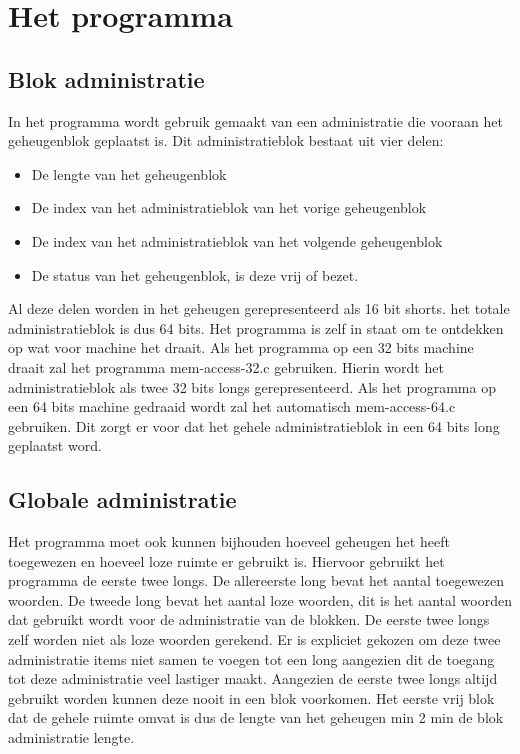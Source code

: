 \documentclass[11pt]{article}
\begin{document}
	\section{Het programma}\label{sec:programma}	
		\subsection{Blok administratie}\label{sec:programmablok}
			In het programma wordt gebruik gemaakt van een administratie die vooraan het geheugenblok geplaatst is. Dit administratieblok bestaat uit vier delen:
			\begin{itemize}
				\item De lengte van het geheugenblok
				\item De index van het administratieblok van het vorige geheugenblok
				\item De index van het administratieblok van het volgende geheugenblok
				\item De status van het geheugenblok, is deze vrij of bezet.
			\end{itemize}
			Al deze delen worden in het geheugen gerepresenteerd als 16 bit shorts. het totale administratieblok is dus 64 bits.
			Het programma is zelf in staat om te ontdekken op wat voor machine het draait.
			Als het programma op een 32 bits machine draait zal het programma mem-access-32.c gebruiken.
			Hierin wordt het administratieblok als twee 32 bits longs gerepresenteerd.
			Als het programma op een 64 bits machine gedraaid wordt zal het automatisch mem-access-64.c gebruiken.
			Dit zorgt er voor dat het gehele administratieblok in een 64 bits long geplaatst word.
		
		\subsection{Globale administratie}\label{sec:programmaglobaal}
			Het programma moet ook kunnen bijhouden hoeveel geheugen het heeft toegewezen en hoeveel loze ruimte er gebruikt is.
			Hiervoor gebruikt het programma de eerste twee longs. De allereerste long bevat het aantal toegewezen woorden.
			De tweede long bevat het aantal loze woorden, dit is het aantal woorden dat gebruikt wordt voor de administratie van de blokken.
			De eerste twee longs zelf worden niet als loze woorden gerekend.
			Er is expliciet gekozen om deze twee administratie items niet samen te voegen tot een long aangezien dit de toegang tot deze administratie veel lastiger maakt.
			Aangezien de eerste twee longs altijd gebruikt worden kunnen deze nooit in een blok voorkomen.
			Het eerste vrij blok dat de gehele ruimte omvat is dus de lengte van het geheugen min 2 min de blok administratie lengte.
		
\end{document}
